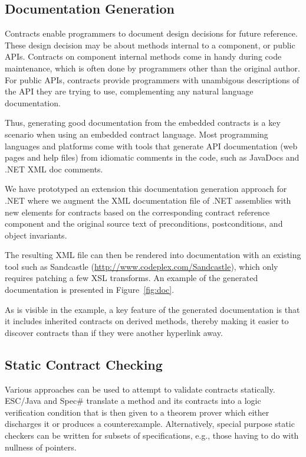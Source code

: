 \documentclass{sig-alternate}
\begin{document}
\subsection{Documentation Generation}
\noindent
Contracts enable programmers to document design decisions for future
reference. These design decision may be about methods internal to a
component, or public APIs. Contracts on component internal methods
come in handy during code maintenance, which is often done by
programmers other than the original author. For public APIs, contracts
provide programmers with unambigous descriptions of the API they are
trying to use, complementing any natural language documentation.

Thus, generating good documentation from the embedded contracts is a
key scenario when using an embedded contract language. Most
programming languages and platforms come with tools that generate API
documentation (web pages and help files) from idiomatic comments in
the code, such as JavaDocs and .NET XML doc comments.

We have prototyped an extension this documentation generation approach
for .NET where we augment the XML documentation file of .NET
assemblies with new elements for contracts based on the corresponding
contract reference component and the original source text of
preconditions, postconditions, and object invariants.

The resulting XML file can then be rendered into documentation with an
existing tool such as Sandcastle
(\url{http://www.codeplex.com/Sandcastle}), which only requires
patching a few XSL transforms.  An example of the generated
documentation is presented in Figure~\ref{fig:doc}.

As is visible in the example, a key feature of the generated
documentation is that it includes inherited contracts on derived
methods, thereby making it easier to discover contracts than if they
were another hyperlink away.

\subsection{Static Contract Checking}
\noindent
Various approaches can be used to attempt to validate contracts
statically. ESC/Java and Spec\# translate a method and its contracts
into a logic verification condition that is then given to a theorem
prover which either discharges it or produces a
counterexample. Alternatively, special purpose static checkers can be
written for subsets of specifications, e.g., those having to do with
nullness of pointers.
\end{document}
